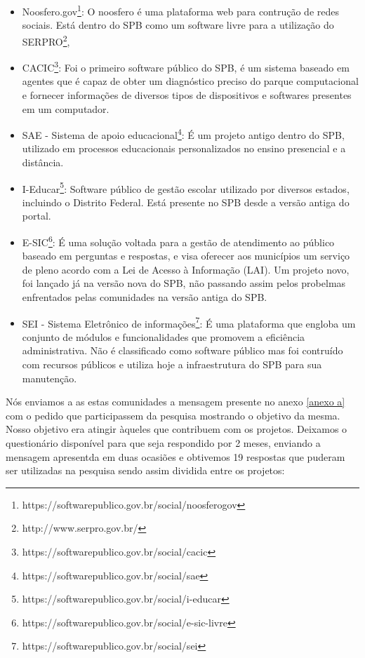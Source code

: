 \begin{itemize}

\item Noosfero.gov\footnote{https://softwarepublico.gov.br/social/noosferogov}: 
O noosfero é uma plataforma web para contrução de redes sociais. Está dentro do
SPB como um software livre para a utilização do SERPRO\footnote{http://www.serpro.gov.br/}, 

\item CACIC\footnote{https://softwarepublico.gov.br/social/cacic}: Foi o primeiro 
software público do SPB, é um sistema baseado em agentes que é capaz de obter um 
diagnóstico preciso do parque computacional e fornecer informações de diversos tipos 
de dispositivos e softwares presentes em um computador.

\item SAE - Sistema de apoio educacional\footnote{https://softwarepublico.gov.br/social/sae}:
É um projeto antigo dentro do SPB, utilizado em processos educacionais personalizados no 
ensino presencial e a distância.  

\item I-Educar\footnote{https://softwarepublico.gov.br/social/i-educar}: Software público de 
gestão escolar utilizado por diversos estados, incluindo o Distrito Federal. Está presente
no SPB desde a versão antiga do portal.

\item E-SIC\footnote{https://softwarepublico.gov.br/social/e-sic-livre}: É uma solução voltada 
para a gestão de atendimento ao público baseado em perguntas e respostas, e visa 
oferecer aos municípios um serviço de pleno acordo com a Lei de Acesso à Informação (LAI).
Um projeto novo, foi lançado já na versão nova do SPB, não passando assim pelos 
probelmas enfrentados pelas comunidades na versão antiga do SPB.

\item SEI - Sistema Eletrônico de informações\footnote{https://softwarepublico.gov.br/social/sei}:
É uma plataforma que engloba um conjunto de módulos e funcionalidades que promovem 
a eficiência administrativa. Não é classificado como software público mas foi contruído com
recursos públicos e utiliza hoje a infraestrutura do SPB para sua manutenção.

\end{itemize}

Nós enviamos a as estas comunidades a mensagem presente no anexo \ref{anexo a}
com o pedido que participassem da pesquisa mostrando o objetivo da mesma. Nosso objetivo 
era atingir àqueles que contribuem com os projetos. Deixamos o questionário disponível 
para que seja respondido por 2 meses, enviando a mensagem apresentda em duas ocasiões e obtivemos
19 respostas que puderam ser utilizadas na pesquisa sendo assim dividida entre os projetos:


